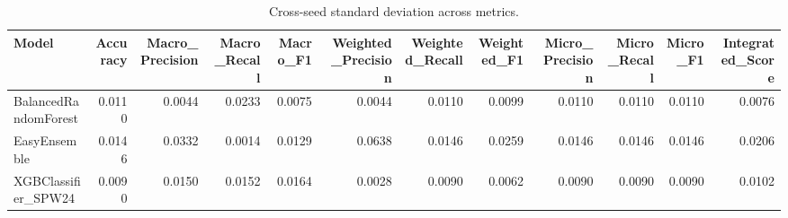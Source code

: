 \begin{table}[t]
\centering
\begin{tabular}{lrrrrrrrrrrr}
\toprule
Model & Accuracy & Macro_Precision & Macro_Recall & Macro_F1 & Weighted_Precision & Weighted_Recall & Weighted_F1 & Micro_Precision & Micro_Recall & Micro_F1 & Integrated_Score \\
\midrule
BalancedRandomForest & 0.0110 & 0.0044 & 0.0233 & 0.0075 & 0.0044 & 0.0110 & 0.0099 & 0.0110 & 0.0110 & 0.0110 & 0.0076 \\
EasyEnsemble & 0.0146 & 0.0332 & 0.0014 & 0.0129 & 0.0638 & 0.0146 & 0.0259 & 0.0146 & 0.0146 & 0.0146 & 0.0206 \\
XGBClassifier_SPW24 & 0.0090 & 0.0150 & 0.0152 & 0.0164 & 0.0028 & 0.0090 & 0.0062 & 0.0090 & 0.0090 & 0.0090 & 0.0102 \\
\bottomrule
\end{tabular}
\caption{Cross-seed standard deviation across metrics.}
\label{tab:cross_seed_std}
\end{table}